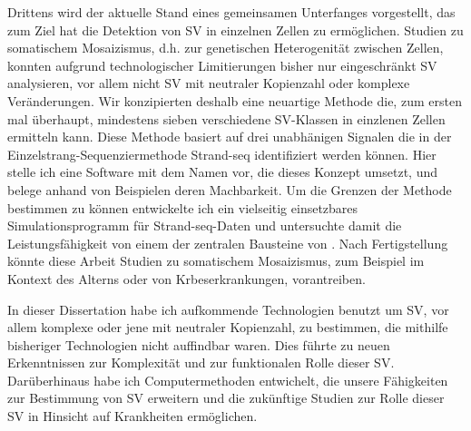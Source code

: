Drittens wird der aktuelle Stand eines gemeinsamen Unterfanges vorgestellt, das
zum Ziel hat die Detektion von SV in einzelnen Zellen zu ermöglichen.
Studien zu somatischem Mosaizismus, d.h. zur genetischen Heterogenität zwischen
Zellen, konnten aufgrund technologischer Limitierungen bisher nur eingeschränkt
SV analysieren, vor allem nicht SV mit neutraler Kopienzahl oder komplexe Veränderungen.
Wir konzipierten deshalb eine neuartige Methode die, zum ersten mal überhaupt,
mindestens sieben verschiedene SV-Klassen in einzlenen Zellen ermitteln kann.
Diese Methode basiert auf drei unabhänigen Signalen die in der
Ein\-zel\-strang-Se\-quen\-zier\-me\-tho\-de Strand-seq identifiziert werden können.
Hier stelle ich eine Software mit dem Namen \mc vor, die dieses Konzept umsetzt,
und belege anhand von Beispielen deren Machbarkeit.
Um die Grenzen der Methode bestimmen zu können entwickelte ich ein vielseitig
einsetzbares Simulationsprogramm für Strand-seq-Daten und untersuchte damit die
Leistungsfähigkeit von einem der zentralen Bausteine von \mc.
Nach Fertigstellung könnte diese Arbeit Studien zu somatischem
Mosaizismus, zum Beispiel im Kontext des Alterns oder von Krbeserkrankungen,
vorantreiben.

In dieser Dissertation habe ich aufkommende Technologien benutzt um SV, vor allem
komplexe oder jene mit neutraler Kopienzahl, zu bestimmen, die mit\-hil\-fe bisheriger
Technologien nicht auffindbar waren. Dies führte zu neuen Erkenntnissen zur
Komplexität und zur funktionalen Rolle dieser SV. Darüberhinaus habe ich
Computermethoden entwichelt, die unsere Fähigkeiten zur Bestimmung von SV erweitern
und die zukünftige Studien zur Rolle dieser SV in Hinsicht auf Krankheiten
ermöglichen.

